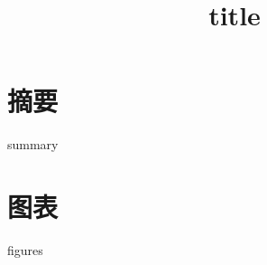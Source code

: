 \documentclass{ctexart}
\title{{title}}
\date{}
\begin{document}
\maketitle
\section*{摘要}
{summary}
\section*{图表}
{figures}
\end{document}

